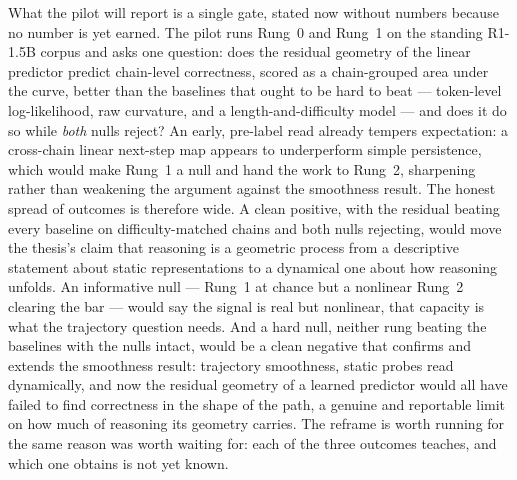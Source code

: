 What the pilot will report is a single gate, stated now without numbers because no
number is yet earned. The pilot runs Rung~0 and Rung~1 on the standing R1-1.5B
corpus and asks one question: does the residual geometry of the linear predictor
predict chain-level correctness, scored as a chain-grouped area under the curve,
better than the baselines that ought to be hard to beat --- token-level
log-likelihood, raw curvature, and a length-and-difficulty model --- and does it
do so while \emph{both} nulls reject? An early, pre-label read already tempers
expectation: a cross-chain linear next-step map appears to underperform simple
persistence, which would make Rung~1 a null and hand the work to Rung~2, sharpening
rather than weakening the argument against the smoothness result. The honest
spread of outcomes is therefore wide. A clean positive, with the residual beating
every baseline on difficulty-matched chains and both nulls rejecting, would move
the thesis's claim that reasoning is a geometric process from a descriptive
statement about static representations to a dynamical one about how reasoning
unfolds. An informative null --- Rung~1 at chance but a nonlinear Rung~2 clearing
the bar --- would say the signal is real but nonlinear, that capacity is what the
trajectory question needs. And a hard null, neither rung beating the baselines
with the nulls intact, would be a clean negative that confirms and extends the
smoothness result: trajectory smoothness, static probes read dynamically, and now
the residual geometry of a learned predictor would all have failed to find
correctness in the shape of the path, a genuine and reportable limit on how much
of reasoning its geometry carries. The reframe is worth running for the same
reason  was worth waiting for: each of the three outcomes
teaches, and which one obtains is not yet known.


